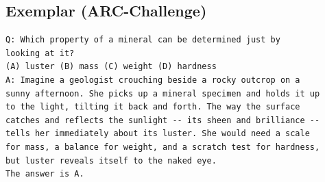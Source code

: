 \subsection{\storycot Exemplar (ARC-Challenge)}

\begin{lstlisting}
Q: Which property of a mineral can be determined just by
looking at it?
(A) luster (B) mass (C) weight (D) hardness
A: Imagine a geologist crouching beside a rocky outcrop on a
sunny afternoon. She picks up a mineral specimen and holds it up
to the light, tilting it back and forth. The way the surface
catches and reflects the sunlight -- its sheen and brilliance --
tells her immediately about its luster. She would need a scale
for mass, a balance for weight, and a scratch test for hardness,
but luster reveals itself to the naked eye.
The answer is A.
\end{lstlisting}
